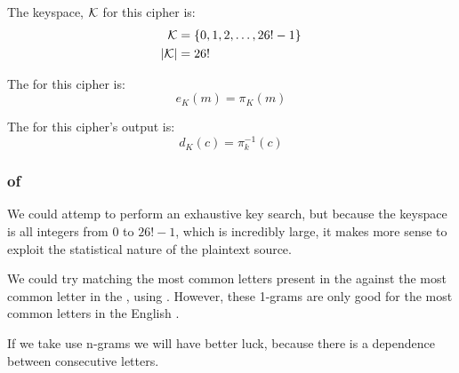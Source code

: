 The keyspace, $\operatorname{\mathcal{K}}$ for this cipher is:
\begin{equation*}
  \begin{aligned}
    \operatorname{\mathcal{K}} &= \lbrace 0, 1, 2, \ldots, 26!-1 \rbrace \\
    \lvert \operatorname{\mathcal{K}} \rvert &= 26!
  \end{aligned}
\end{equation*}

The  for this cipher is:
\begin{equation}\label{eq:Simple_Substitution_Cipher-Encryption}
  e_{K}(m) = \pi_{K}(m)
\end{equation}

The  for this cipher's output is:
\begin{equation}\label{eq:Simple_Substitution_Cipher-Decryption}
  d_{K}(c) = \pi_{k}^{-1}(c)
\end{equation}

\subsubsection{ of }\label{subsubsec:Cryptanalysis_Simple_Substitution_Cipher}
We could attemp to perform an exhaustive key search, but because the keyspace is all integers from 0 to $26!-1$, which is incredibly large, it makes more sense to exploit the statistical nature of the plaintext source.

We could try matching the most common letters present in the  against the most common letter in the  , using .
However, these 1-grams are only good for the most common letters in the English .

If we take use n-grams we will have better luck, because there is a dependence between consecutive letters.
